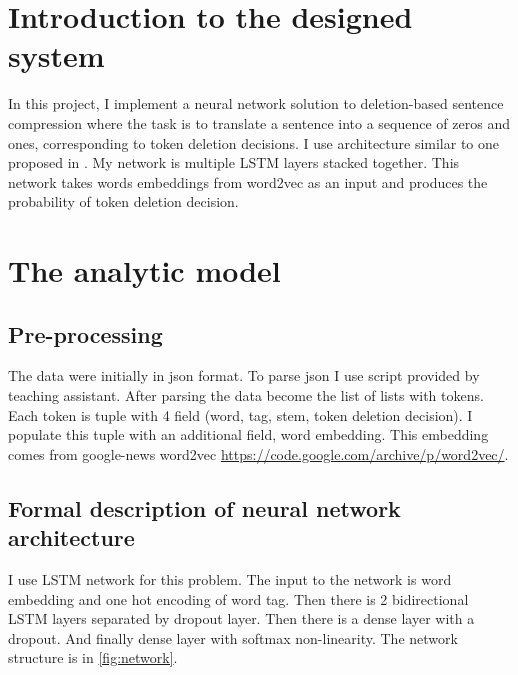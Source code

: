 \documentclass[a4paper,12pt,oneside]{article}
\begin{document}
\section {Introduction to the designed system}
In this project, I implement a neural network solution to deletion-based sentence compression where the task is to translate a sentence into a sequence of zeros and ones, corresponding to token deletion decisions. I use architecture similar to one proposed in \cite{lstm}. My network is multiple LSTM layers stacked together. This network takes words embeddings from word2vec as an input and produces the probability of token deletion decision.

\section {The analytic model}

\subsection{Pre-processing}
The data were initially in json format. To parse json I use script provided by teaching assistant. After parsing the data become the list of lists with tokens. Each token is tuple with 4 field (word, tag, stem, token deletion decision). I populate this tuple with an additional field, word embedding. This embedding comes from google-news word2vec \url{https://code.google.com/archive/p/word2vec/}.

\subsection{Formal description of neural network architecture}
I use LSTM network for this problem. The input to the network is word embedding and one hot encoding of word tag. Then there is 2 bidirectional LSTM layers separated by dropout layer. Then there is a dense layer with a dropout. And finally dense layer with softmax non-linearity. The network structure is in \cref{fig:network}.
\end{document}
